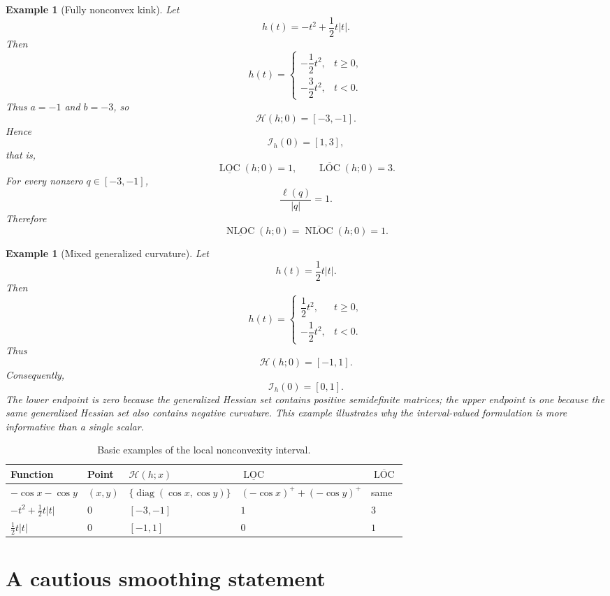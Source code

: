\documentclass[11pt]{article}
\numberwithin{equation}{section}
\newtheorem{example}[theorem]{Example}
\newcommand{\Hess}{\mathcal H}
\newcommand{\LOC}{\operatorname{LOC}}
\newcommand{\NLOC}{\operatorname{NLOC}}
\begin{document}
	\begin{example}[Fully nonconvex kink]
		Let
		\[
		h(t)
		=
		-t^2+\frac12 t|t|.
		\]
		Then
		\[
		h(t)
		=
		\begin{cases}
			-\dfrac12 t^2, & t\geq0,\\[4pt]
			-\dfrac32 t^2, & t<0.
		\end{cases}
		\]
		Thus \(a=-1\) and \(b=-3\), so
		\[
		\Hess(h;0)=[-3,-1].
		\]
		Hence
		\[
		\mathcal I_h(0)=[1,3],
		\]
		that is,
		\[
		\underline{\LOC}(h;0)=1,
		\qquad
		\overline{\LOC}(h;0)=3.
		\]
		For every nonzero \(q\in[-3,-1]\),
		\[
		\frac{\ell(q)}{|q|}=1.
		\]
		Therefore
		\[
		\underline{\NLOC}(h;0)
		=
		\overline{\NLOC}(h;0)
		=
		1.
		\]
	\end{example}
	
	\begin{example}[Mixed generalized curvature]
		Let
		\[
		h(t)=\frac12 t|t|.
		\]
		Then
		\[
		h(t)
		=
		\begin{cases}
			\dfrac12 t^2, & t\geq0,\\[4pt]
			-\dfrac12 t^2, & t<0.
		\end{cases}
		\]
		Thus
		\[
		\Hess(h;0)=[-1,1].
		\]
		Consequently,
		\[
		\mathcal I_h(0)=[0,1].
		\]
		The lower endpoint is zero because the generalized Hessian set contains positive semidefinite matrices; the upper endpoint is one because the same generalized Hessian set also contains negative curvature. This example illustrates why the interval-valued formulation is more informative than a single scalar.
	\end{example}
	
	\begin{table}[h]
		\centering
		\begin{tabular}{lllll}
			\toprule
			Function & Point & \(\Hess(h;x)\) & \(\underline{\LOC}\) & \(\overline{\LOC}\) \\
			\midrule
			\(-\cos x-\cos y\) & \((x,y)\) &
			\(\{\operatorname{diag}(\cos x,\cos y)\}\) &
			\((-\cos x)^++(-\cos y)^+\) &
			same \\
			\(-t^2+\frac12t|t|\) & \(0\) &
			\([-3,-1]\) &
			\(1\) &
			\(3\) \\
			\(\frac12t|t|\) & \(0\) &
			\([-1,1]\) &
			\(0\) &
			\(1\) \\
			\bottomrule
		\end{tabular}
		\caption{Basic examples of the local nonconvexity interval.}
	\end{table}
	
	\section{A cautious smoothing statement}
	
\end{document}
